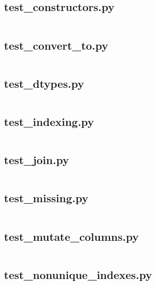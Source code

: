 \documentclass{article}
\begin{document}
\subsection{test\_constructors.py}
\inputminted{python}{/home/dufferzafar/dev/@clones/pandas/pandas/tests/frame/test_constructors.py}
\newpage

\subsection{test\_convert\_to.py}
\inputminted{python}{/home/dufferzafar/dev/@clones/pandas/pandas/tests/frame/test_convert_to.py}
\newpage

\subsection{test\_dtypes.py}
\inputminted{python}{/home/dufferzafar/dev/@clones/pandas/pandas/tests/frame/test_dtypes.py}
\newpage

\subsection{test\_indexing.py}
\inputminted{python}{/home/dufferzafar/dev/@clones/pandas/pandas/tests/frame/test_indexing.py}
\newpage

\subsection{test\_join.py}
\inputminted{python}{/home/dufferzafar/dev/@clones/pandas/pandas/tests/frame/test_join.py}
\newpage

\subsection{test\_missing.py}
\inputminted{python}{/home/dufferzafar/dev/@clones/pandas/pandas/tests/frame/test_missing.py}
\newpage

\subsection{test\_mutate\_columns.py}
\inputminted{python}{/home/dufferzafar/dev/@clones/pandas/pandas/tests/frame/test_mutate_columns.py}
\newpage

\subsection{test\_nonunique\_indexes.py}
\inputminted{python}{/home/dufferzafar/dev/@clones/pandas/pandas/tests/frame/test_nonunique_indexes.py}
\newpage
\end{document}
